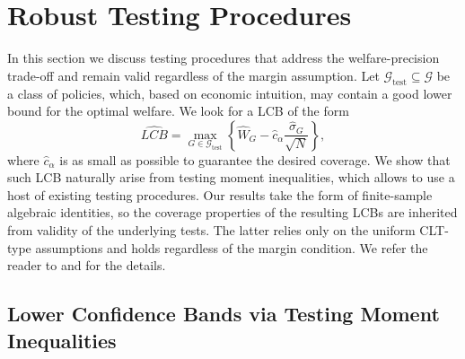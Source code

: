 \documentclass[12pt]{article}
\numberwithin{equation}{section}
\theoremstyle{plain}                         %
\theoremstyle{definition}                  %
\theoremstyle{remark}                      %
\begin{document}



\section{Robust Testing Procedures}
\label{sec:moment}

In this section we discuss testing procedures that address the welfare-precision trade-off and remain valid regardless of the margin assumption. Let $\mathcal{G}_{\text{test}} \subseteq \mathcal{G}$ be a class of policies, which, based on economic intuition, may contain a good lower bound for the optimal welfare. We look for a LCB of the form
	\begin{equation} \label{eq:lcb_generic}
	\widehat{LCB} = \max \limits_{G \in \mathcal{G}_{\text{test}}} \left\{ \widehat{W}_G - \hat{c}_{\alpha}  \frac{\hat{\sigma}_G}{\sqrt{N}} \right\},
	\end{equation}
	where $\hat{c}_\alpha$ is as small as possible to guarantee the desired coverage. We show that such LCB naturally arise from testing moment inequalities, which allows to use a host of existing testing procedures. Our results take the form of finite-sample algebraic identities, so the coverage properties of the resulting LCBs are inherited from validity of the underlying tests. The latter relies only on the uniform CLT-type assumptions and holds regardless of the margin condition.  We refer the reader to \citet{CLR} and \citet{canay2017practical} for the details. 

\subsection{Lower Confidence Bands via Testing Moment Inequalities}
\label{sec:lcb_testing_inequalities}
\end{document}
